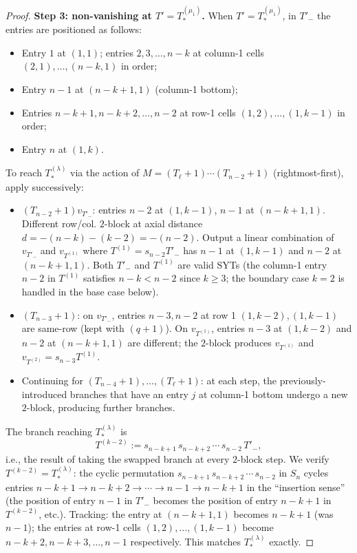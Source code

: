 \documentclass[11pt]{article}
\theoremstyle{definition}
\begin{document}
\begin{proof}
\textbf{Step 3: non-vanishing at $T' = T_{*}^{(\mu_1)}$.}  When
$T' = T_{*}^{(\mu_1)}$, in $T'_-$ the entries are positioned as follows:
\begin{itemize}[leftmargin=2em,topsep=0.2em,itemsep=0.1em]
\item Entry $1$ at $(1, 1)$; entries $2, 3, \ldots, n-k$ at column-1 cells
$(2,1), \ldots, (n-k, 1)$ in order;
\item Entry $n-1$ at $(n-k+1, 1)$ (column-1 bottom);
\item Entries $n-k+1, n-k+2, \ldots, n-2$ at row-1 cells
$(1, 2), \ldots, (1, k-1)$ in order;
\item Entry $n$ at $(1, k)$.
\end{itemize}

To reach $T_{*}^{(\lambda)}$ via the action of $M = (T_\ell{+}1)\cdots
(T_{n-2}{+}1)$ (rightmost-first), apply successively:
\begin{itemize}[leftmargin=2em,topsep=0.2em,itemsep=0.1em]
\item $(T_{n-2}{+}1) v_{T'_-}$: entries $n-2$ at $(1, k-1)$, $n-1$ at
$(n-k+1, 1)$.  Different row/col.  $2$-block at axial distance
$d = -(n-k) - (k-2) = -(n-2)$.  Output a linear combination of
$v_{T'_-}$ and $v_{T^{(1)}}$ where $T^{(1)} = s_{n-2} T'_-$ has $n-1$ at
$(1, k-1)$ and $n-2$ at $(n-k+1, 1)$.  Both $T'_-$ and $T^{(1)}$ are valid
SYTs (the column-1 entry $n-2$ in $T^{(1)}$ satisfies $n-k < n-2$ since
$k \ge 3$; the boundary case $k = 2$ is handled in the base case below).

\item $(T_{n-3}{+}1)$: on $v_{T'_-}$, entries $n-3, n-2$ at row 1
$(1, k-2), (1, k-1)$ are same-row (kept with $(q+1)$).  On $v_{T^{(1)}}$,
entries $n-3$ at $(1, k-2)$ and $n-2$ at $(n-k+1, 1)$ are different;
the $2$-block produces $v_{T^{(1)}}$ and $v_{T^{(2)}} = s_{n-3} T^{(1)}$.

\item Continuing for $(T_{n-4}{+}1), \ldots, (T_{\ell}{+}1)$:
at each step, the previously-introduced branches that have an entry
$j$ at column-1 bottom undergo a new $2$-block, producing further
branches.
\end{itemize}

The branch reaching $T_{*}^{(\lambda)}$ is
\[
    T^{(k-2)} := s_{n-k+1}\,s_{n-k+2}\,\cdots\,s_{n-2}\,T'_-,
\]
i.e., the result of taking the swapped branch at every $2$-block step.
We verify $T^{(k-2)} = T_{*}^{(\lambda)}$: the cyclic permutation
$s_{n-k+1}\,s_{n-k+2}\,\cdots\,s_{n-2}$ in $S_n$ cycles entries
$n{-}k{+}1 \to n{-}k{+}2 \to \cdots \to n{-}1 \to n{-}k{+}1$ in the
``insertion sense'' (the position of entry $n-1$ in $T'_-$ becomes
the position of entry $n-k+1$ in $T^{(k-2)}$, etc.).  Tracking:
the entry at $(n-k+1, 1)$ becomes $n-k+1$ (was $n-1$); the entries
at row-1 cells $(1, 2), \ldots, (1, k-1)$ become $n-k+2, n-k+3, \ldots,
n-1$ respectively.  This matches $T_{*}^{(\lambda)}$ exactly.


\end{proof}
\end{document}
